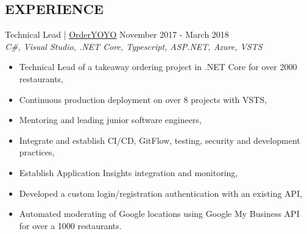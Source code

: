 \documentclass[margin, 10pt, hidelinks]{res} %
\newcommand{\emphasize}{\large} %
\begin{document}
\begin{resume}








\section{EXPERIENCE}

{\emphasize Technical Lead} | \href{https://orderyoyo.com/}{\underline{OrderYOYO}}    \hfill November 2017 - March 2018  \\
{\it C\#, Visual Studio, .NET Core, Typescript, ASP.NET, Azure, VSTS} %
\begin{itemize} \setlength{\itemindent}{-0.1in}\itemsep 0pt %
\item Technical Lead of a takeaway ordering project in .NET Core for over 2000 restaurants,
\item Continuous production deployment on over 8 projects with VSTS,
\item Mentoring and leading junior software engineers,
\item Integrate and establish  CI/CD, GitFlow, testing, security and development practices,
\item Establish Application Insights integration and monitoring,
\item Developed a custom login/registration authentication with an existing API,
\item Automated moderating of Google locations using Google My Business API for over a 1000 restaurants.
\end{itemize}


\end{resume}
\end{document}
